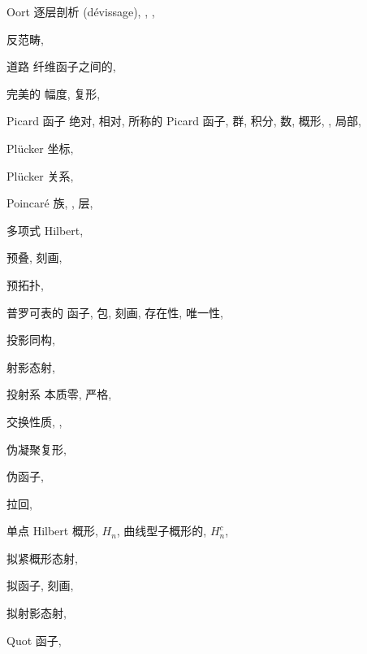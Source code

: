 \begin{theindex}
\item Oort 逐层剖析 (dévissage), , , 
\item 反范畴, 
\indexspace
\item 道路
\subitem 纤维函子之间的, 
\item 完美的
\subitem 幅度, 
\subitem 复形, 
\item Picard
\subitem 函子
\subsubitem 绝对, 
\subsubitem 相对, 
\subsubitem 所称的 Picard 函子, 
\subitem 群, 
\subitem 积分, 
\subitem 数, 
\subitem 概形, , 
\subsubitem 局部, 
\item Plücker 坐标, 
\item Plücker 关系, 
\item Poincaré
\subitem 族, , 
\subitem 层, 
\item 多项式
\subitem Hilbert, 
\item 预叠, 
\subitem 刻画, 
\item 预拓扑, 
\item 普罗可表的
\subitem 函子, 
\subitem 包, 
\subsubitem 刻画, 
\subsubitem 存在性, 
\subsubitem 唯一性, 
\item 投影同构, 
\item 射影态射, 
\item 投射系
\subitem 本质零, 
\subitem 严格, 
\item 交换性质, , 
\item 伪凝聚复形, 
\item 伪函子, 
\item 拉回, 
\item 单点 Hilbert 概形, $H_n$, 
\subitem 曲线型子概形的, $H_n^c$, 
\indexspace
\item 拟紧概形态射, 
\item 拟函子, 
\subitem 刻画, 
\item 拟射影态射, 
\item Quot 函子, 

\end{theindex}
